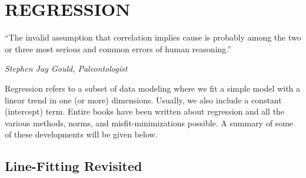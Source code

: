 %
\chapter{REGRESSION}
\label{ch:regression}
\epigraph{``The invalid assumption that correlation implies cause is probably among the two or three most serious and common errors of human reasoning.''}{\textit{Stephen Jay Gould, Paleontologist}}
Regression refers to a subset of data modeling where we fit a simple model with a linear trend in one (or more) dimensions.  Usually, we also include a constant (intercept) term.  Entire books have been written about regression
and all the various methods, norms, and misfit-minimizations possible.  A summary of some of these developments will be given below.
\section{Line-Fitting Revisited}

